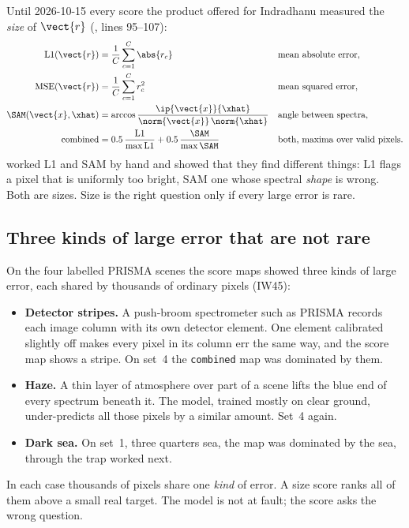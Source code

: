 Until 2026-10-15 every score the product offered for Indradhanu measured the \emph{size} of $\vect{r}$
(, lines 95--107):
\begin{align*}
\text{L1}(\vect{r}) &= \frac1C\sum_{c=1}^{C}\abs{r_c} &&\text{mean absolute error},\\
\text{MSE}(\vect{r}) &= \frac1C\sum_{c=1}^{C}r_c^2 &&\text{mean squared error},\\
\SAM(\vect{x},\xhat) &= \arccos\frac{\ip{\vect{x}}{\xhat}}{\norm{\vect{x}}\,\norm{\xhat}} &&\text{angle between spectra},\\
\text{combined} &= 0.5\,\frac{\text{L1}}{\max\text{L1}}+0.5\,\frac{\SAM}{\max\SAM} &&\text{both, maxima over valid pixels}.
\end{align*}
 worked L1 and SAM by hand and showed that they find different things: L1 flags a pixel that
is uniformly too bright, SAM one whose spectral \emph{shape} is wrong. Both are sizes. Size is the right
question only if every large error is rare.

\subsection{Three kinds of large error that are not rare}

On the four labelled PRISMA scenes the score maps showed three kinds of large error, each shared by thousands
of ordinary pixels (IW45):
\begin{itemize}
\item \textbf{Detector stripes.} A push-broom spectrometer such as PRISMA records each image column with its
  own detector element. One element calibrated slightly off makes every pixel in its column err the same
  way, and the score map shows a stripe. On set~4 the \texttt{combined} map was dominated by them.
\item \textbf{Haze.} A thin layer of atmosphere over part of a scene lifts the blue end of every spectrum
  beneath it. The model, trained mostly on clear ground, under-predicts all those pixels by a similar
  amount. Set~4 again.
\item \textbf{Dark sea.} On set~1, three quarters sea, the map was dominated by the sea, through the trap
  worked next.
\end{itemize}
In each case thousands of pixels share one \emph{kind} of error. A size score ranks all of them above a small
real target. The model is not at fault; the score asks the wrong question.

